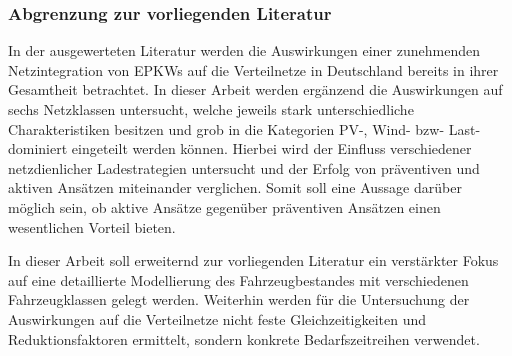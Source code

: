 \subsubsection{Abgrenzung zur vorliegenden Literatur}

In der ausgewerteten Literatur werden die Auswirkungen einer zunehmenden Netzintegration von \glspl{EPKW} auf die Verteilnetze in Deutschland bereits in ihrer Gesamtheit betrachtet.
In dieser Arbeit werden ergänzend die Auswirkungen auf sechs Netzklassen untersucht, welche jeweils stark unterschiedliche Charakteristiken besitzen und grob in die Kategorien \gls{PV}-, Wind- bzw- Last-dominiert eingeteilt werden können.
Hierbei wird der Einfluss verschiedener netzdienlicher Ladestrategien untersucht und der Erfolg von präventiven und aktiven Ansätzen miteinander verglichen.
Somit soll eine Aussage darüber möglich sein, ob aktive Ansätze gegenüber präventiven Ansätzen einen wesentlichen Vorteil bieten.\medskip

In dieser Arbeit soll erweiternd zur vorliegenden Literatur ein verstärkter Fokus auf eine detaillierte Modellierung des Fahrzeugbestandes mit verschiedenen Fahrzeugklassen gelegt werden.
Weiterhin werden für die Untersuchung der Auswirkungen auf die Verteilnetze nicht feste Gleichzeitigkeiten und Reduktionsfaktoren ermittelt, sondern konkrete Bedarfszeitreihen verwendet.

